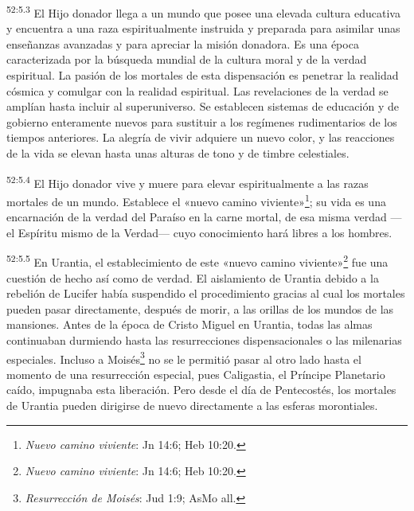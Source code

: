 \par
\textsuperscript{52:5.3} El Hijo donador llega a un mundo que posee una elevada cultura educativa y encuentra a una raza espiritualmente instruida y preparada para asimilar unas enseñanzas avanzadas y para apreciar la misión donadora. Es una época caracterizada por la búsqueda mundial de la cultura moral y de la verdad espiritual. La pasión de los mortales de esta dispensación es penetrar la realidad cósmica y comulgar con la realidad espiritual. Las revelaciones de la verdad se amplían hasta incluir al superuniverso. Se establecen sistemas de educación y de gobierno enteramente nuevos para sustituir a los regímenes rudimentarios de los tiempos anteriores. La alegría de vivir adquiere un nuevo color, y las reacciones de la vida se elevan hasta unas alturas de tono y de timbre celestiales.

\par
\textsuperscript{52:5.4} El Hijo donador vive y muere para elevar espiritualmente a las razas mortales de un mundo. Establece el «nuevo camino viviente»\footnote{\textit{Nuevo camino viviente}: Jn 14:6; Heb 10:20.}; su vida es una encarnación de la verdad del Paraíso en la carne mortal, de esa misma verdad ---el Espíritu mismo de la Verdad--- cuyo conocimiento hará libres a los hombres.

\par
\textsuperscript{52:5.5} En Urantia, el establecimiento de este «nuevo camino viviente»\footnote{\textit{Nuevo camino viviente}: Jn 14:6; Heb 10:20.} fue una cuestión de hecho así como de verdad. El aislamiento de Urantia debido a la rebelión de Lucifer había suspendido el procedimiento gracias al cual los mortales pueden pasar directamente, después de morir, a las orillas de los mundos de las mansiones. Antes de la época de Cristo Miguel en Urantia, todas las almas continuaban durmiendo hasta las resurrecciones dispensacionales o las milenarias especiales. Incluso a Moisés\footnote{\textit{Resurrección de Moisés}: Jud 1:9; AsMo all.} no se le permitió pasar al otro lado hasta el momento de una resurrección especial, pues Caligastia, el Príncipe Planetario caído, impugnaba esta liberación. Pero desde el día de Pentecostés, los mortales de Urantia pueden dirigirse de nuevo directamente a las esferas morontiales.

